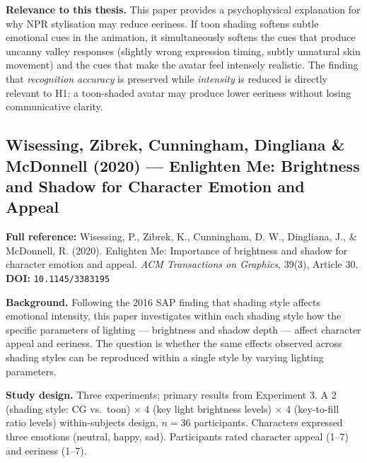 \documentclass[11pt, a4paper]{article}
\begin{document}
\textbf{Relevance to this thesis.} This paper provides a psychophysical explanation for why NPR stylisation may reduce eeriness. If toon shading softens subtle emotional cues in the animation, it simultaneously softens the cues that produce uncanny valley responses (slightly wrong expression timing, subtly unnatural skin movement) and the cues that make the avatar feel intensely realistic. The finding that \textit{recognition accuracy} is preserved while \textit{intensity} is reduced is directly relevant to H1: a toon-shaded avatar may produce lower eeriness without losing communicative clarity.

\vspace{8pt}
\subsection{Wisessing, Zibrek, Cunningham, Dingliana \& McDonnell (2020) --- Enlighten Me: Brightness and Shadow for Character Emotion and Appeal}

\begin{refbox}
\textbf{Full reference:} Wisessing, P., Zibrek, K., Cunningham, D. W., Dingliana, J., \& McDonnell, R. (2020). Enlighten Me: Importance of brightness and shadow for character emotion and appeal. \textit{ACM Transactions on Graphics}, 39(3), Article 30.\\[4pt]
\textbf{DOI:} \texttt{10.1145/3383195}
\end{refbox}

\textbf{Background.} Following the 2016 SAP finding that shading style affects emotional intensity, this paper investigates within each shading style how the specific parameters of lighting --- brightness and shadow depth --- affect character appeal and eeriness. The question is whether the same effects observed across shading styles can be reproduced within a single style by varying lighting parameters.

\textbf{Study design.} Three experiments; primary results from Experiment 3. A $2$ (shading style: CG vs.\ toon) $\times$ 4 (key light brightness levels) $\times$ 4 (key-to-fill ratio levels) within-subjects design, $n = 36$ participants. Characters expressed three emotions (neutral, happy, sad). Participants rated character appeal (1--7) and eeriness (1--7).
\end{document}
